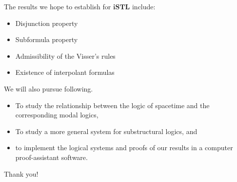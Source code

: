 \documentclass{beamer}
\begin{document}
\begin{frame}{\subResults}
	The results we hope to establish for $\mathbf{iSTL}$ include:
	\begin{itemize}
		\item Disjunction property
		\item Subformula property
		\item Admissibility of the Visser's rules
		\item Existence of interpolant formulas
	\end{itemize}
\end{frame}

\begin{frame}{\subFurther}
	We will also pursue following.
\begin{itemize}
  \item To study the relationship between the logic of spacetime and the corresponding modal logics,
  \item To study a more general system for substructural logics, and
  \item to implement the logical systems and proofs of our results in a computer proof-assistant software.
\end{itemize}
\end{frame}




\begin{frame}[noframenumbering]{\quad}
	\begin{center}
		\Huge Thank you!
	\end{center}
\end{frame}
\end{document}
